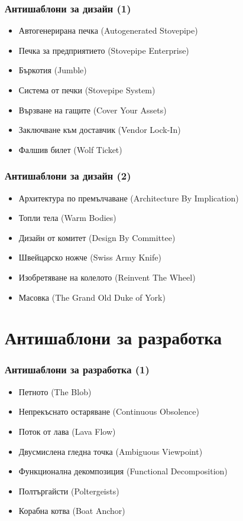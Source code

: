 \documentclass[alsotrans]{beamerswitch}
\begin{document}
\begin{frame}
  \frametitle{Антишаблони за дизайн (1)}

  \begin{itemize}[<+->]
  \item Автогенерирана печка (Autogenerated Stovepipe)
  \item Печка за предприятието (Stovepipe Enterprise)
  \item Бъркотия (Jumble)
  \item Система от печки (Stovepipe System)
  \item Вързване на гащите (Cover Your Assets)
  \item Заключване към доставчик (Vendor Lock-In)
  \item Фалшив билет (Wolf Ticket)
  \end{itemize}
\end{frame}

\begin{frame}
  \frametitle{Антишаблони за дизайн (2)}

  \begin{itemize}[<+->]
  \item Архитектура по премълчаване (Architecture By Implication)
  \item Топли тела (Warm Bodies)
  \item Дизайн от комитет (Design By Committee)
  \item Швейцарско ножче (Swiss Army Knife)
  \item Изобретяване на колелото (Reinvent The Wheel)
  \item Масовка (The Grand Old Duke of York)
  \end{itemize}
\end{frame}

\section{Антишаблони за разработка}

\begin{frame}
  \frametitle{Антишаблони за разработка (1)}

  \begin{itemize}[<+->]
  \item Петното (The Blob)
  \item Непрекъснато остаряване (Continuous Obsolence)
  \item Поток от лава (Lava Flow)
  \item Двусмислена гледна точка (Ambiguous Viewpoint)
  \item Функционална декомпозиция (Functional Decomposition)
  \item Полтъргайсти (Poltergeists)
  \item Корабна котва (Boat Anchor)
  \end{itemize}
\end{frame}
\end{document}
